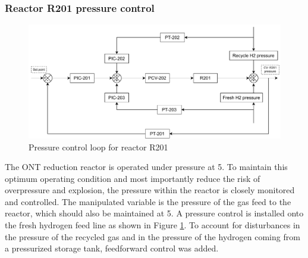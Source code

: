 \subsubsection{Reactor R201 pressure control} %
    \begin{figure}
        \centering
        \includegraphics[width=\linewidth]{chapters/4-operation-control/4-Figures/R201-PC.pdf}
        \caption{Pressure control loop for reactor R201}
        \label{fig:R201-PC}
    \end{figure}
The ONT reduction reactor is operated under pressure at \SI{5}{\atm}. To maintain this optimum operating condition and most importantly reduce the risk of overpressure and explosion, the pressure within the reactor is closely monitored and controlled. The manipulated variable is the pressure of the gas feed to the reactor, which should also be maintained at \SI{5}{\atm}. A pressure control is installed onto the fresh hydrogen feed line as shown in Figure \ref{fig:R201-PC}. To account for disturbances in the pressure of the recycled gas and in the pressure of the hydrogen coming from a pressurized storage tank, feedforward control was added. 

